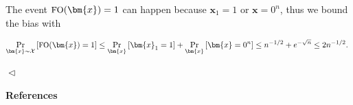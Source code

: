 \documentclass[10pt,a4paper]{article}
\begin{document}
The event ${\textrm{\small{FO}}}(\bm{x})=1$ can happen because $\bm{x}_{1}=1$ or $\bm{x}=0^{n}$, thus we bound the bias with\par


\[\begin{gathered}
\Pr_{\bm{x}\sim\mathcal{X}}\left[{\textrm{\small{FO}}}(\bm{x})=1\right]\leq\Pr_{\bm{x}}\left[\bm{x}_{1}=1\right]+\Pr_{\bm{x}}\left[\bm{x}=0^{n}\right]\leq n^{-1/2}+e^{-\sqrt{n}}\leq 2n^{-1/2}.\
\end{gathered}\]


$\vartriangleleft$\par






\par\medskip\noindent\textbf{References}\par
\end{document}
